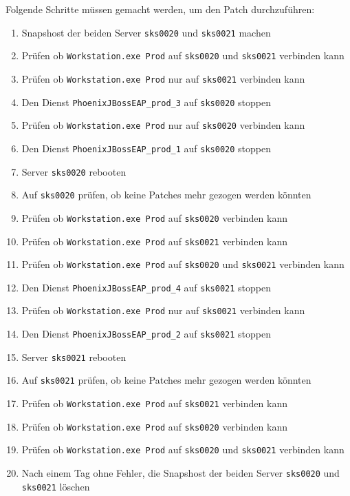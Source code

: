 \begin{flushleft}
    Folgende Schritte müssen gemacht werden, um den Patch durchzuführen:
    \begin{enumerate}
        \item Snapshost der beiden Server \texttt{sks0020} und \texttt{sks0021} machen
        \item Prüfen ob \texttt{Workstation.exe Prod} auf \texttt{sks0020} und \texttt{sks0021} verbinden kann
        \item Prüfen ob \texttt{Workstation.exe Prod} nur auf \texttt{sks0021} verbinden kann
        \item Den Dienst \texttt{PhoenixJBossEAP\_prod\_3} auf \texttt{sks0020} stoppen
        \item Prüfen ob \texttt{Workstation.exe Prod} nur auf \texttt{sks0020} verbinden kann
        \item Den Dienst \texttt{PhoenixJBossEAP\_prod\_1} auf \texttt{sks0020} stoppen
        \item Server \texttt{sks0020} rebooten
        \item Auf \texttt{sks0020} prüfen, ob keine Patches mehr gezogen werden könnten
        \item Prüfen ob \texttt{Workstation.exe Prod} auf \texttt{sks0020} verbinden kann
        \item Prüfen ob \texttt{Workstation.exe Prod} auf \texttt{sks0021} verbinden kann
        \item Prüfen ob \texttt{Workstation.exe Prod} auf \texttt{sks0020} und \texttt{sks0021} verbinden kann
        \item Den Dienst \texttt{PhoenixJBossEAP\_prod\_4} auf \texttt{sks0021} stoppen
        \item Prüfen ob \texttt{Workstation.exe Prod} nur auf \texttt{sks0021} verbinden kann
        \item Den Dienst \texttt{PhoenixJBossEAP\_prod\_2} auf \texttt{sks0021} stoppen
        \item Server \texttt{sks0021} rebooten
        \item Auf \texttt{sks0021} prüfen, ob keine Patches mehr gezogen werden könnten
        \item Prüfen ob \texttt{Workstation.exe Prod} auf \texttt{sks0021} verbinden kann
        \item Prüfen ob \texttt{Workstation.exe Prod} auf \texttt{sks0020} verbinden kann
        \item Prüfen ob \texttt{Workstation.exe Prod} auf \texttt{sks0020} und \texttt{sks0021} verbinden kann
        \item Nach einem Tag ohne Fehler, die Snapshost der beiden Server \texttt{sks0020} und \texttt{sks0021} löschen
    \end{enumerate}
\end{flushleft}
